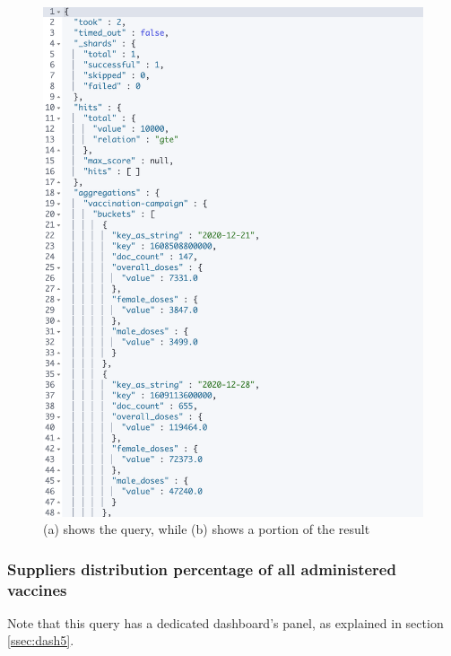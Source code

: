 \documentclass{article}[IEEEtran]
\begin{document}
\begin{figure}[H]
\begin{center}
\begin{minipage}[b]{0.4\textwidth}
    \includegraphics[width=\textwidth, frame]{Answer_Query_4BIS.PNG}
     \subcaption{}
  \end{minipage}
  \caption{(a) shows the query, while (b) shows a portion of the result}
\end{center}
\end{figure}

\newpage

\subsubsection{Suppliers distribution percentage of all administered vaccines}\label{ssec:q4}


Note that this query has a dedicated dashboard's panel, as explained in section \ref{ssec:dash5}.
\end{document}
